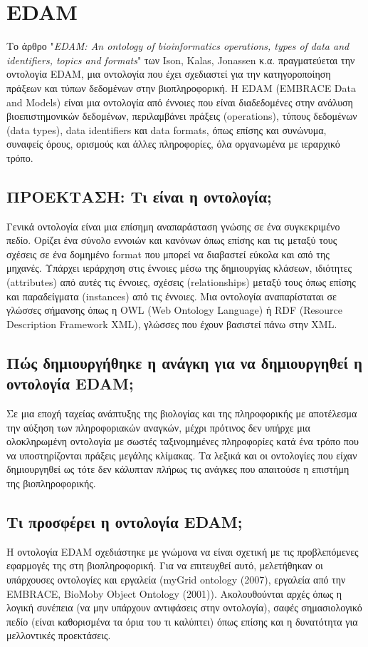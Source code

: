 \section{EDAM}
    Το άρθρο "\textit{EDAM: An ontology of bioinformatics operations, types of data and identifiers, topics and formats}" των Ison, Kalas, Jonassen κ.α. πραγματεύεται την οντολογία EDAM, μια οντολογία που έχει σχεδιαστεί για την κατηγοροποίηση πράξεων και τύπων δεδομένων στην βιοπληροφορική. \cite{EDAMpaper}
    Η EDAM (EMBRACE Data and Models) είναι μια οντολογία από έννοιες που είναι διαδεδομένες στην ανάλυση βιοεπιστημονικών δεδομένων, περιλαμβάνει πράξεις (operations), τύπους δεδομένων (data types), data identifiers και data formats, όπως επίσης και συνώνυμα, συναφείς όρους, ορισμούς και άλλες πληροφορίες, όλα οργανωμένα με ιεραρχικό τρόπο. \cite{EDAMsite}

    \subsection{ΠΡΟΕΚΤΑΣΗ: Τι είναι η οντολογία;}
        Γενικά οντολογία είναι μια επίσημη αναπαράσταση γνώσης σε ένα συγκεκριμένο πεδίο.
        Ορίζει ένα σύνολο εννοιών και κανόνων όπως επίσης και τις μεταξύ τους σχέσεις σε ένα δομημένο format που μπορεί να διαβαστεί εύκολα και από της μηχανές.
        Υπάρχει ιεράρχηση στις έννοιες μέσω της δημιουργίας κλάσεων, ιδιότητες (attributes) από αυτές τις έννοιες, σχέσεις (relationships) μεταξύ τους όπως επίσης και παραδείγματα (instances) από τις έννοιες.
        Μια οντολογία αναπαρίσταται σε γλώσσες σήμανσης όπως η OWL (Web Ontology Language) ή RDF (Resource Description Framework XML), γλώσσες που έχουν βασιστεί πάνω στην XML. \cite{OntologyWiki} \cite{BioOntologies}

    \subsection{Πώς δημιουργήθηκε η ανάγκη για να δημιουργηθεί η οντολογία EDAM;}
        Σε μια εποχή ταχείας ανάπτυξης της βιολογίας και της πληροφορικής με αποτέλεσμα την αύξηση των πληροφοριακών αναγκών, μέχρι πρότινος δεν υπήρχε μια ολοκληρωμένη οντολογία με σωστές ταξινομημένες πληροφορίες κατά ένα τρόπο που να υποστηρίζονται πράξεις μεγάλης κλίμακας.
        Τα λεξικά και οι οντολογίες που είχαν δημιουργηθεί ως τότε δεν κάλυπταν πλήρως τις ανάγκες που απαιτούσε η επιστήμη της βιοπληροφορικής.

    \subsection{Τι προσφέρει η οντολογία EDAM;}
        Η οντολογία EDAM σχεδιάστηκε με γνώμονα να είναι σχετική με τις προβλεπόμενες εφαρμογές της στη βιοπληροφορική.
        Για να επιτευχθεί αυτό, μελετήθηκαν οι υπάρχουσες οντολογίες και εργαλεία (myGrid ontology (2007), εργαλεία από την EMBRACE, BioMoby Object Ontology (2001)).
        Ακολουθούνται αρχές όπως η λογική συνέπεια (να μην υπάρχουν αντιφάσεις στην οντολογία), σαφές σημασιολογικό πεδίο (είναι καθορισμένα τα όρια του τι καλύπτει) όπως επίσης και η δυνατότητα για μελλοντικές προεκτάσεις.

